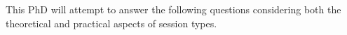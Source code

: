 

This PhD will attempt to answer the following questions considering both the theoretical and practical aspects of session types.

